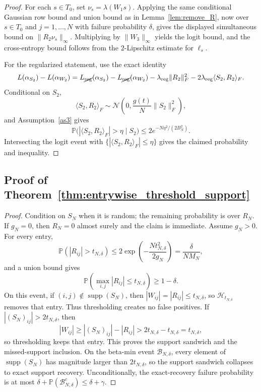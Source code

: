 \documentclass[11pt]{article}
\theoremstyle{plain}
\theoremstyle{definition}
\theoremstyle{remark}
\newcommand{\PP}{\mathbb{P}}
\newcommand{\1}{\mathbf{1}}
\begin{document}
\begin{proof}
For each \(s\in T_0\), set \(\nu_s=\lambda(W_1s)\). Applying the same conditional Gaussian row bound and union bound as in Lemma~\ref{lem:remove_R}, now over \(s\in T_0\) and \(j=1,\dots,N\) with failure probability \(\delta\), gives the displayed simultaneous bound on \(\|R_2\nu_s\|_\infty\). Multiplying by \(\|W_3\|_\infty\) yields the logit bound, and the cross-entropy bound follows from the \(2\)-Lipschitz estimate for \(\ell_s\).

For the regularized statement, use the exact identity
\[
L(\alpha_{S_2})-L(\alpha_{W_2})
=
L_{\cancel{\mathrm{reg}}}(\alpha_{S_2})-L_{\cancel{\mathrm{reg}}}(\alpha_{W_2})
-\lambda_{\mathrm{reg}}\|R_2\|_F^2
-2\lambda_{\mathrm{reg}}\langle S_2,R_2\rangle_F.
\]
Conditional on \(S_2\),
\[
\langle S_2,R_2\rangle_F
\sim
\mathcal N\!\left(0,\frac{g(t)}{N}\|S_2\|_F^2\right),
\]
and Assumption~\ref{as3} gives
\[
\PP\big(|\langle S_2,R_2\rangle_F|>\eta\mid S_2\big)
\le
2e^{-N\eta^2/(2B_N^2)}.
\]
Intersecting the logit event with \(\{|\langle S_2,R_2\rangle_F|\le\eta\}\) gives the claimed probability and inequality.
\end{proof}



\subsection{Proof of Theorem~\ref{thm:entrywise_threshold_support}}

\begin{proof}
Condition on \(S_N\) when it is random; the remaining probability is over \(R_N\).
If \(g_N=0\), then \(R_N=0\) almost surely and the claim is immediate. Assume \(g_N>0\). 
For every entry,
\[
\PP(|R_{ij}|>t_{N,\delta})
\le
2\exp\!\left(-\frac{Nt_{N,\delta}^2}{2g_N}\right)
=
\frac{\delta}{NM_N},
\]
and a union bound gives
\[
\PP\!\left(\max_{i,j}|R_{ij}|\le t_{N,\delta}\right)\ge1-\delta.
\]
On this event, if \((i,j)\notin\operatorname{supp}(S_N)\), then \(|W_{ij}|=|R_{ij}|\le t_{N,\delta}\), so \(\mathcal H_{t_{N,\delta}}\) removes that entry. Thus thresholding creates no false positives. If \(|(S_N)_{ij}|>2t_{N,\delta}\), then
\[
|W_{ij}|\ge |(S_N)_{ij}|-|R_{ij}|>2t_{N,\delta}-t_{N,\delta}=t_{N,\delta},
\]
so thresholding keeps that entry. This proves the support sandwich and the missed-support inclusion. On the beta-min event \(\mathcal B_{N,\delta}\), every element of \(\operatorname{supp}(S_N)\) has magnitude larger than \(2t_{N,\delta}\), so the support sandwich collapses to exact support recovery. Unconditionally, the exact-recovery failure probability is at most \(\delta+\PP(\mathcal B_{N,\delta}^c)\le\delta+\gamma\).
\end{proof}
\end{document}
